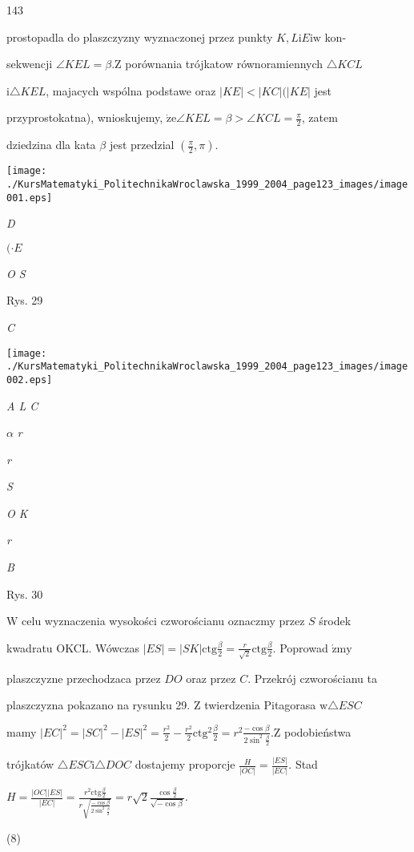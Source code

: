 \documentclass[a4paper,12pt]{article}
\begin{document}
143

prostopadla do plaszczyzny wyznaczonej przez punkty $K, L\mathrm{i}E\mathrm{i}\mathrm{w}$ kon-

sekwencji $\angle KEL=\beta. \mathrm{Z}$ porównania trójkatow równoramiennych $\triangle KCL$

$\mathrm{i} \triangle KEL$, majacych wspólna podstawe oraz $|KE| < |KC| (|KE|$ jest

przyprostokatna), wnioskujemy, $\dot{\mathrm{z}}\mathrm{e} \angle KEL = \beta > \angle KCL = \displaystyle \frac{\pi}{2}$, zatem

dziedzina dla kata $\beta$ jest przedzial $(\displaystyle \frac{\pi}{2},\pi).$
\begin{center}
\texttt{[image: ./KursMatematyki\_PolitechnikaWroclawska\_1999\_2004\_page123\_images/image001.eps]}
\end{center}
{\it D}

$(\cdot E$

{\it O S}

Rys. 29

{\it C}
\begin{center}
\texttt{[image: ./KursMatematyki\_PolitechnikaWroclawska\_1999\_2004\_page123\_images/image002.eps]}
\end{center}
{\it A  L C}

$\alpha$  {\it r}

{\it r}

{\it S}

{\it O K}

{\it r}

{\it B}

Rys. 30

$\mathrm{W}$ celu wyznaczenia wysokości czworościanu oznaczmy przez $S$ środek

kwadratu OKCL. Wówczas $|ES|= |SK|\displaystyle \mathrm{c}\mathrm{t}\mathrm{g}\frac{\beta}{2}=\frac{r}{\sqrt{2}}\mathrm{c}\mathrm{t}\mathrm{g}\frac{\beta}{2}.$ Poprowad $\acute{\mathrm{z}}\mathrm{m}\mathrm{y}$

plaszczyzne przechodzaca przez $DO$ oraz przez $C$. Przekrój czworościanu ta

plaszczyzna pokazano na rysunku 29. $\mathrm{Z}$ twierdzenia Pitagorasa $\mathrm{w}\triangle ESC$

mamy $|EC|^{2}=|SC|^{2}-|ES|^{2}=\displaystyle \frac{r^{2}}{2}-\frac{r^{2}}{2}\mathrm{c}\mathrm{t}\mathrm{g}^{2}\frac{\beta}{2}=r^{2}\frac{-\cos\beta}{2\sin^{2}\frac{\beta}{2}}. \mathrm{Z}$ podobieństwa

trójkatów $\triangle ESC\mathrm{i}\triangle DOC$ dostajemy proporcje $\displaystyle \frac{H}{|OC|} = \displaystyle \frac{|ES|}{|EC|}$. Stad

$H=\displaystyle \frac{|OC||ES|}{|EC|}=\frac{r^{2}\mathrm{c}\mathrm{t}\mathrm{g}\frac{\beta}{2}}{r\sqrt{\frac{-\cos\beta}{2\sin^{2}\frac{\beta}{2}}}}=r\sqrt{2}\frac{\cos\frac{\beta}{2}}{\sqrt{-\cos\beta}}.$

(8)
\end{document}
